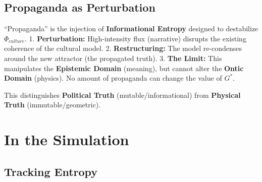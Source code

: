\documentclass[
  11pt,
  letterpaper,
  twoside,
  openright]{book}
\begin{document}
\subsection{Propaganda as
Perturbation}\label{propaganda-as-perturbation}

``Propaganda'' is the injection of \textbf{Informational Entropy}
designed to destabilize \(\Phi_{culture}\). 1. \textbf{Perturbation:}
High-intensity flux (narrative) disrupts the existing coherence of the
cultural model. 2. \textbf{Restructuring:} The model re-condenses around
the new attractor (the propagated truth). 3. \textbf{The Limit:} This
manipulates the \textbf{Epistemic Domain} (meaning), but cannot alter
the \textbf{Ontic Domain} (physics). No amount of propaganda can change
the value of \(G^*\).

This distinguishes \textbf{Political Truth} (mutable/informational) from
\textbf{Physical Truth} (immutable/geometric).

\section{In the Simulation}\label{in-the-simulation}

\subsection{Tracking Entropy}\label{tracking-entropy}
\end{document}
